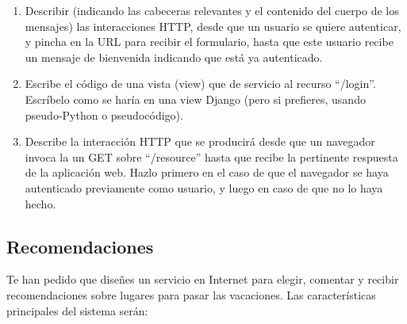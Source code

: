 {\begin{enumerate}
\item Describir (indicando las cabeceras relevantes y el contenido del cuerpo de los mensajes) las interacciones HTTP, desde que un usuario se quiere autenticar, y pincha en la URL para recibir el formulario, hasta que este usuario recibe un mensaje de bienvenida indicando que está ya autenticado.
\item Escribe el código de una vista (view) que de servicio al recurso ``/login''. Escríbelo como se haría en una view Django (pero si prefieres, usando pseudo-Python o pseudocódigo).
\item Describe la interacción HTTP que se producirá desde que un navegador invoca la un GET sobre ``/resource'' hasta que recibe la pertinente respuesta de la aplicación web. Hazlo primero en el caso de que el navegador se haya autenticado previamente como usuario, y luego en caso de que no lo haya hecho.
\end{enumerate}

\subsection{Recomendaciones}

Te han pedido que diseñes un servicio en Internet para elegir, comentar y recibir recomendaciones sobre lugares para pasar las vacaciones. Las características principales del sistema serán:

}
